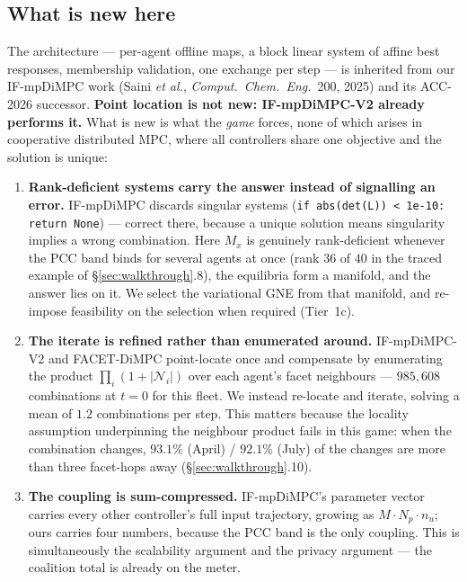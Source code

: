 \documentclass[11pt, letterpaper]{article}
\begin{document}
\subsection{What is new here}
The architecture --- per-agent offline maps, a block linear system of affine best responses, membership
validation, one exchange per step --- is inherited from our IF-mpDiMPC work (Saini \emph{et al.},
\emph{Comput.\ Chem.\ Eng.}\ 200, 2025) and its ACC-2026 successor. \textbf{Point location is not new:
IF-mpDiMPC-V2 already performs it.} What is new is what the \emph{game} forces, none of which arises in
cooperative distributed MPC, where all controllers share one objective and the solution is unique:

\begin{enumerate}[leftmargin=1.7em,nosep,itemsep=3pt]
\item \textbf{Rank-deficient systems carry the answer instead of signalling an error.} IF-mpDiMPC
discards singular systems (\texttt{if abs(det(L)) < 1e-10: return None}) --- correct there, because a
unique solution means singularity implies a wrong combination. Here $M_x$ is genuinely rank-deficient
whenever the PCC band binds for several agents at once (rank $36$ of $40$ in the traced example of
\S\ref{sec:walkthrough}.8), the equilibria form a manifold, and the answer lies on it. We select the
variational GNE from that manifold, and re-impose feasibility on the selection when required
(Tier~1c).
\item \textbf{The iterate is refined rather than enumerated around.} IF-mpDiMPC-V2 and FACET-DiMPC
point-locate once and compensate by enumerating the product $\prod_i(1+|\mathcal N_i|)$ over each
agent's facet neighbours --- $985{,}608$ combinations at $t{=}0$ for this fleet. We instead re-locate
and iterate, solving a mean of $\mathbf{1.2}$ combinations per step. This matters because the locality
assumption underpinning the neighbour product fails in this game: when the combination changes,
$93.1\%$ (April) / $92.1\%$ (July) of the changes are more than three facet-hops away
(\S\ref{sec:walkthrough}.10).
\item \textbf{The coupling is sum-compressed.} IF-mpDiMPC's parameter vector carries every other
controller's full input trajectory, growing as $M\!\cdot\!N_p\!\cdot\!n_u$; ours carries four numbers,
because the PCC band is the only coupling. This is simultaneously the scalability argument and the
privacy argument --- the coalition total is already on the meter.
\end{enumerate}
\end{document}
